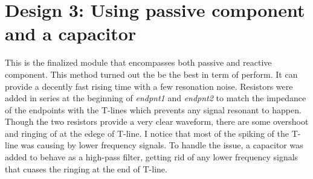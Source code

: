 \documentclass[letterpaper,10pt,titlepage,fleqn]{article}
\begin{document}
\section*{Design 3: Using passive component and a capacitor}
This is the finalized module that encompasses both passive and reactive 
component. This method turned out the be the best in term of perform. It
can provide a decently fast rising time with a few resonation noise. 
Resistors were added in series at the beginning of \textit{endpnt1} and 
\textit{endpnt2} to match the impedance of the endpoints with the T-lines
which prevents any signal resonant to happen. Though the two resistors 
provide a very clear waveform, there are some overshoot and ringing of 
at the edege of T-line. I notice that most of the spiking of the T-line
was causing by lower frequency signals. To handle the issue, a capacitor 
was added to behave as a high-pass filter, getting rid of any lower frequency 
signals that cuases the ringing at the end of T-line. 
\end{document}
